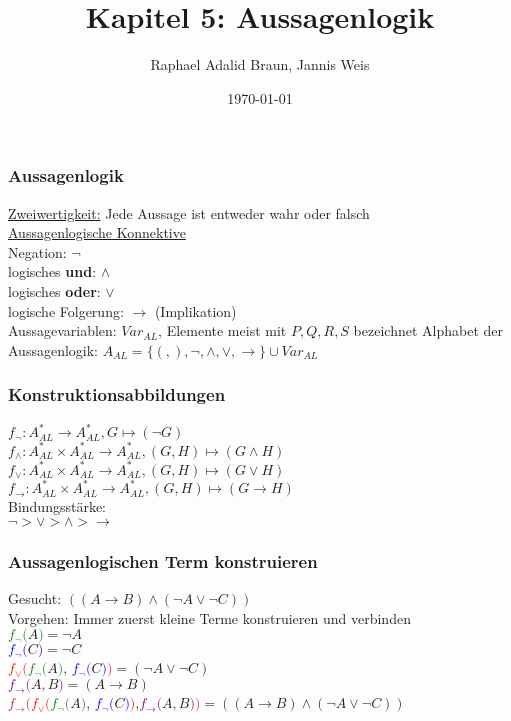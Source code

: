 \documentclass{beamer}
\title{Kapitel 5: Aussagenlogik}
\author{Raphael Adalid Braun, Jannis Weis}
\date{\today}
\institute{KIT - Karlruher Institut für Technologie}
\begin{document}
	\begin{frame}
		\titlepage
	\end{frame}
	\begin{frame}
		\frametitle{Aussagenlogik}
		\underline{Zweiwertigkeit:} Jede Aussage ist entweder wahr oder falsch\\
		\underline{Aussagenlogische Konnektive}\\
		Negation: $\neg$\\
		logisches \textbf{und}: $\wedge$\\
		logisches \textbf{oder}: $\vee$\\
		logische Folgerung: $\rightarrow$ (Implikation)\\
		Aussagevariablen: $Var_{AL}$, Elemente meist mit $P, Q, R, S$ bezeichnet
		Alphabet der Aussagenlogik: $A_{AL}=\{(,),\neg,\wedge,\vee,\rightarrow\}\cup Var_{AL}$\\
	\end{frame}
	\begin{frame}
		\frametitle{Konstruktionsabbildungen}
		$f_{\neg}: A^{\ast}_{AL}\longrightarrow A^{\ast}_{AL}, G\mapsto (\neg G)$\\
		$f_{\wedge}:A^{\ast}_{AL}\times A^{\ast}_{AL}\longrightarrow A^{\ast}_{AL}, (G, H)\mapsto (G\wedge H)$\\
		$f_{\vee}:A^{\ast}_{AL}\times A^{\ast}_{AL}\longrightarrow A^{\ast}_{AL}, (G, H)\mapsto (G\vee H)$\\
		$f_{\rightarrow}:A^{\ast}_{AL}\times A^{\ast}_{AL}\longrightarrow A^{\ast}_{AL}, (G, H)\mapsto (G\rightarrow H)$\\
		Bindungsstärke:\\
		$\neg>\vee>\wedge>\rightarrow$\\
	\end{frame}
	\begin{frame}
		\frametitle{Aussagenlogischen Term konstruieren}
		Gesucht: $((A\rightarrow B)\wedge (\neg A\vee\neg C))$\\
		Vorgehen: Immer zuerst kleine Terme konstruieren und verbinden\\
		\textcolor{green}{$f_{\neg} ($}$A$\textcolor{green}{$)$}$ = \neg A$\\
		\textcolor{blue}{$f_{\neg}($}$C$\textcolor{blue}{$)$}$ = \neg C$\\
		\textcolor{red}{$f_{\vee}($}\textcolor{green}{$f_{\neg} ($}$A$\textcolor{green}{$)$}, \textcolor{blue}{$f_{\neg}($}$C$\textcolor{blue}{$)$}\textcolor{red}{$)$}$ = (\neg A\vee\neg C)$\\
		\textcolor{purple}{$f_{\rightarrow}($}$A,B$\textcolor{purple}{$)$}$ = (A\rightarrow B)$\\
		\textcolor{brown}{$f_{\rightarrow}($}\textcolor{red}{$f_{\vee}($}\textcolor{green}{$f_{\neg} ($}$A$\textcolor{green}{$)$}, \textcolor{blue}{$f_{\neg}($}$C$\textcolor{blue}{$)$}\textcolor{red}{$)$},\textcolor{purple}{$f_{\rightarrow}($}$A,B$\textcolor{purple}{$)$}\textcolor{brown}{$)$}$ = ((A\rightarrow B)\wedge (\neg A\vee\neg C))$\\
	\end{frame}
\end{document}
